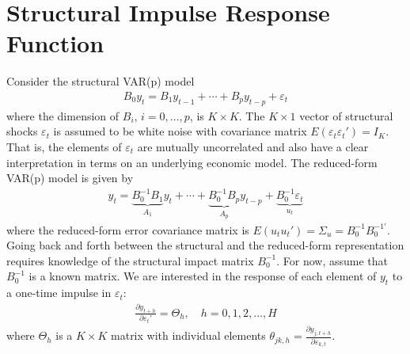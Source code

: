 \section[Structural Impulse Response Function]{Structural Impulse Response Function\label{ex:StructuralImpulseResponseFunction}}
Consider the structural VAR(p) model
\begin{align*}
B_0y_t = B_1 y_{t-1} + \cdots  + B_{p} y_{t-p} + \varepsilon_{t}
\end{align*}
where the dimension of \(B_i\), \(i = 0,\ldots ,p\), is \(K \times K\).
The \(K \times 1\) vector of structural shocks \(\varepsilon_{t}\) is assumed to be white noise with covariance matrix \(E(\varepsilon_t \varepsilon_t') = I_K\).
That is, the elements of \(\varepsilon_t\) are mutually uncorrelated and also have a clear interpretation in terms on an underlying economic model.
The reduced-form VAR(p) model is given by
\begin{align*}
    y_t = \underbrace{B_0^{-1}B_1}_{A_1}y_t + \cdots  + \underbrace{B_0^{-1}B_p}_{A_p} y_{t-p} + \underbrace{B_0^{-1}\varepsilon_t}_{u_t}
\end{align*}
where the reduced-form error covariance matrix is \(E(u_t u_t')=\Sigma_u = B_0^{-1}B_0^{-1'}\).
Going back and forth between the structural and the reduced-form representation requires knowledge of the structural impact matrix \(B_0^{-1}\).
For now, assume that \(B_0^{-1}\) is a known matrix.
We are interested in the response of each element of \(y_t\) to a one-time impulse in \(\varepsilon_{t}\):
\begin{align*}
    \frac{\partial y_{t+h}}{\partial \varepsilon_{t}'} = \Theta_h, \quad h=0,1,2,\ldots ,H
\end{align*}
where \(\Theta_h\) is a \(K\times K\) matrix with individual elements \(\theta_{jk,h}=\frac{\partial y_{j,t+h}}{\partial \varepsilon_{k,t}}\).

